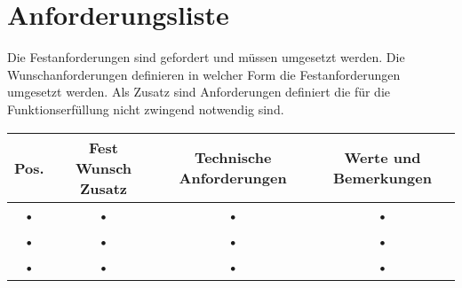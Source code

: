 \section{Anforderungsliste}
Die Festanforderungen sind gefordert und müssen umgesetzt werden. Die Wunschanforderungen definieren in welcher Form die Festanforderungen umgesetzt werden. Als Zusatz sind Anforderungen definiert die für die Funktionserfüllung nicht zwingend notwendig sind.\\ 
\begin{center}
\begin{tabular}{|c|c|c|c|}
\hline 
Pos. & Fest Wunsch Zusatz & Technische Anforderungen & Werte und Bemerkungen \\ 
\hline 
• & • & • & • \\ 
\hline 
• & • & • & • \\ 
\hline 
• & • & • & • \\ 
\hline 
\end{tabular} 
\end{center}